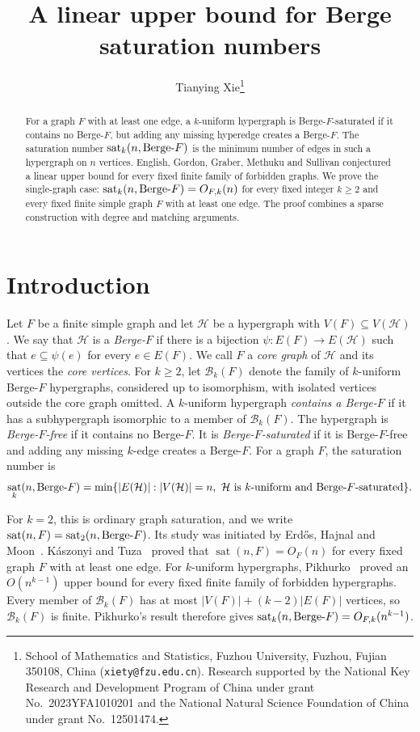 \documentclass[11pt,a4paper]{article}
\title{A linear upper bound for Berge saturation numbers}
\author{Tianying Xie\footnote{\raggedright School of Mathematics and Statistics,
Fuzhou University, Fuzhou, Fujian 350108, China
(\texttt{xiety@fzu.edu.cn}). Research supported by the National Key
Research and Development Program of China under grant No.~2023YFA1010201
and the National Natural Science Foundation of China under grant
No.~12501474.}}
\date{}
\numberwithin{equation}{section}
\theoremstyle{definition}
\theoremstyle{plain}
\DeclareMathOperator{\sat}{sat}
\newcommand{\BF}{\textup{Berge-}F}
\newcommand{\HH}{\mathcal H}
\begin{document}
\maketitle
\begin{abstract}
For a graph $F$ with at least one edge, a $k$-uniform hypergraph is
Berge-$F$-saturated if it contains no Berge-$F$, but adding any missing
hyperedge creates a Berge-$F$. The saturation number $\sat_k(n,\BF)$
is the minimum number of edges in such a hypergraph on $n$ vertices.
English, Gordon, Graber, Methuku and Sullivan conjectured a linear upper
bound for every fixed finite family of forbidden graphs. We prove the
single-graph case: $\sat_k(n,\BF)=O_{F,k}(n)$ for every fixed integer
$k\ge2$ and every fixed finite simple graph $F$ with at least one edge. 
The proof combines a sparse construction with degree and matching arguments.
\end{abstract}

\section{Introduction}\label{sec:introduction}

Let $F$ be a finite simple graph and let $\HH$ be a hypergraph with
$V(F)\subseteq V(\HH)$. We say that
$\HH$ is a \emph{Berge-$F$} if there is a bijection
$\psi:E(F)\longrightarrow E(\HH)$ such that $e\subseteq\psi(e)$
for every $e\in E(F)$. We call $F$ a \emph{core graph} of $\HH$
and its vertices the \emph{core vertices}.
For $k\ge2$, let $\mathcal B_k(F)$ denote the family of $k$-uniform
Berge-$F$ hypergraphs, considered up to isomorphism, with isolated
vertices outside the core graph omitted.
A $k$-uniform hypergraph \emph{contains a Berge-$F$} if it has a
subhypergraph isomorphic to a member of $\mathcal B_k(F)$. 
The hypergraph is \emph{Berge-$F$-free} if it contains no Berge-$F$.
It is \emph{Berge-$F$-saturated} if
it is Berge-$F$-free and adding any missing $k$-edge creates a Berge-$F$.
For a graph $F$, the saturation number is
\[
 \sat_k(n,\BF)=\min\{|E(\HH)|:|V(\HH)|=n,\ \HH\text{ is $k$-uniform and
 Berge-$F$-saturated}\}.
\]

For $k=2$, this is ordinary graph saturation, and we write
$\sat(n,F)=\sat_2(n,\BF)$. Its study was initiated by
Erd\H{o}s, Hajnal and Moon~\cite{EHM}. K\'aszonyi and
Tuza~\cite{KT} proved that $\sat(n,F)=O_F(n)$ for every fixed graph
$F$ with at least one edge. For $k$-uniform hypergraphs, Pikhurko~\cite{Pik} proved an
$O(n^{k-1})$ upper bound for every fixed finite family of forbidden
hypergraphs. Every member of $\mathcal B_k(F)$ has at most
$|V(F)|+(k-2)|E(F)|$ vertices, so $\mathcal B_k(F)$ is finite.
Pikhurko's result therefore gives
$\sat_k(n,\BF)=O_{F,k}(n^{k-1})$.
\end{document}
